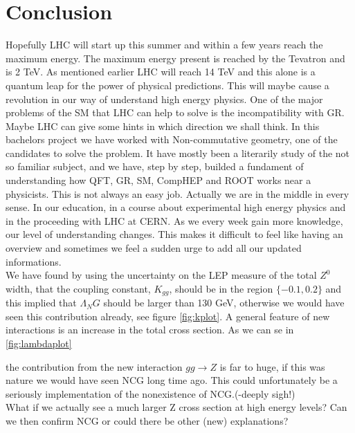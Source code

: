 \section{Conclusion}
Hopefully LHC will start up this summer and within a few years reach the maximum energy. The maximum energy present is reached by the Tevatron and is 2 TeV. As mentioned earlier LHC will reach 14 TeV and this alone is a quantum leap for the power of physical predictions. This will maybe cause a revolution in our way of understand high energy physics. One of the major problems of the SM that LHC can help to solve is the incompatibility with GR. Maybe LHC can give some hints in which direction we shall think. In this bachelors project we have worked with Non-commutative geometry, one of the candidates to solve the problem. It have mostly been a literarily study of the not so familiar subject, and we have, step by step, builded a fundament of understanding how QFT, GR, SM, CompHEP and ROOT works near a physicists. This is not always an easy job. Actually we are in the middle in every sense. In our education, in a course about experimental high energy physics and in the proceeding with LHC at CERN. As we every week gain more knowledge, our level of understanding changes. This makes it difficult to feel like having an overview and sometimes we feel a sudden urge to add all our updated informations. \\


We have found by using the uncertainty on the LEP measure of the total $Z^0$ width, that the coupling constant, $K_{gg}$, should be in the region $\{-0.1,0.2\}$ and this implied that $\Lambda_NG$ should be larger than 130 GeV, otherwise we would have seen this contribution already, see figure \ref{fig:kplot}. A general feature of new interactions is an increase in the total cross section. As we can se in \ref{fig:lambdaplot}


the contribution from the new interaction $gg \rightarrow Z$ is far to huge, if this was nature we would have seen NCG long time ago. This could unfortunately be a seriously implementation of the nonexistence of NCG.(-deeply sigh!)\\

What if we actually see a much larger Z cross section at high energy levels? Can we then confirm NCG or could there be other (new) explanations?